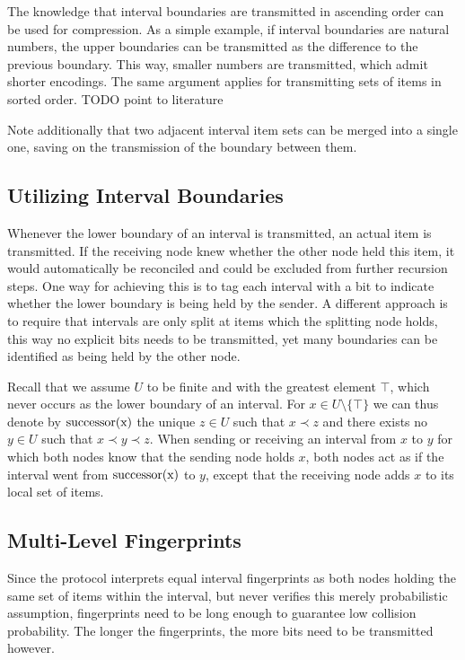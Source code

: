 The knowledge that interval boundaries are transmitted in ascending order can be used for compression. As a simple example, if interval boundaries are natural numbers, the upper boundaries can be transmitted as the difference to the previous boundary. This way, smaller numbers are transmitted, which admit shorter encodings. The same argument applies for transmitting sets of items in sorted order. TODO point to literature

Note additionally that two adjacent interval item sets can be merged into a single one, saving on the transmission of the boundary between them.

\subsection{Utilizing Interval Boundaries}

Whenever the lower boundary of an interval is transmitted, an actual item is transmitted. If the receiving node knew whether the other node held this item, it would automatically be reconciled and could be excluded from further recursion steps. One way for achieving this is to tag each interval with a bit to indicate whether the lower boundary is being held by the sender. A different approach is to require that intervals are only split at items which the splitting node holds, this way no explicit bits needs to be transmitted, yet many boundaries can be identified as being held by the other node.

Recall that we assume $U$ to be finite and with the greatest element $\top$, which never occurs as the lower boundary of an interval. For $x \in U \setminus \{\top\}$ we can thus denote by $\operatorname{successor({x})}$ the unique $z \in U$ such that $x \prec z$ and there exists no $y \in U$ such that $x \prec y \prec z$. When sending or receiving an interval from $x$ to $y$ for which both nodes know that the sending node holds $x$, both nodes act as if the interval went from $\operatorname{successor({x})}$ to $y$, except that the receiving node adds $x$ to its local set of items.

\subsection{Multi-Level Fingerprints}

Since the protocol interprets equal interval fingerprints as both nodes holding the same set of items within the interval, but never verifies this merely probabilistic assumption, fingerprints need to be long enough to guarantee low collision probability. The longer the fingerprints, the more bits need to be transmitted however.

